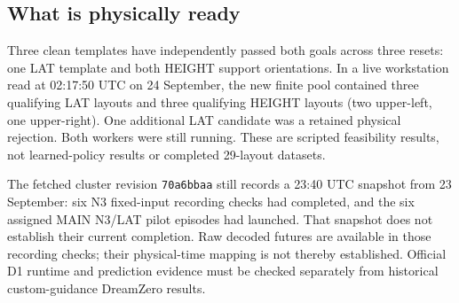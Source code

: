 \subsection{What is physically ready}
Three clean templates have independently passed both goals across three resets: one LAT template and both HEIGHT support orientations. In a live workstation read at 02:17:50 UTC on 24 September, the new finite pool contained three qualifying LAT layouts and three qualifying HEIGHT layouts (two upper-left, one upper-right). One additional LAT candidate was a retained physical rejection. Both workers were still running. These are scripted feasibility results, not learned-policy results or completed 29-layout datasets.

The fetched cluster revision \texttt{70a6bbaa} still records a 23:40 UTC snapshot from 23 September: six N3 fixed-input recording checks had completed, and the six assigned MAIN N3/LAT pilot episodes had launched. That snapshot does not establish their current completion. Raw decoded futures are available in those recording checks; their physical-time mapping is not thereby established. Official D1 runtime and prediction evidence must be checked separately from historical custom-guidance DreamZero results.

